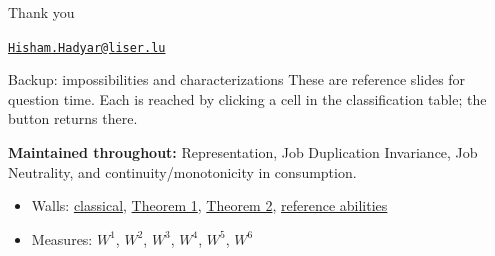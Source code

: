\documentclass[10pt]{beamer}
\begin{document}
\begin{frame}[standout]
  Thank you

  \vspace{1em}
  {\normalsize\href{mailto:hisham.hadyar@liser.lu}{\texttt{Hisham.Hadyar@liser.lu}}}
\end{frame}


\begin{frame}{Backup: impossibilities and characterizations}
\small
These are reference slides for question time. Each is reached by clicking a
cell in the classification table; the button returns there.
\par\smallskip
\textbf{Maintained throughout:} Representation, Job Duplication Invariance, Job
Neutrality, and continuity/monotonicity in consumption.
\begin{itemize}\footnotesize
  \item Walls: \hyperlink{imp:classical}{classical}, \hyperlink{imp:thm1}{Theorem 1}, \hyperlink{imp:thm2}{Theorem 2}, \hyperlink{imp:refabil}{reference abilities}
  \item Measures: \hyperlink{char:w1}{$W^1$}, \hyperlink{char:w2}{$W^2$}, \hyperlink{char:w3}{$W^3$}, \hyperlink{char:w4}{$W^4$}, \hyperlink{char:w5}{$W^5$}, \hyperlink{char:w6}{$W^6$}
\end{itemize}
\hyperlink{tab:classification}{}
\end{frame}
\end{document}
